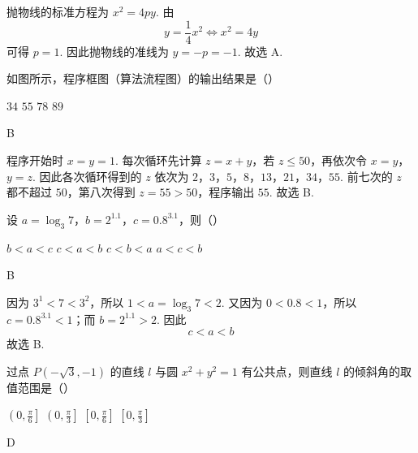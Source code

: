 \begin{solution}
抛物线的标准方程为 \(x^2=4py\). 由
\[
y=\frac14x^2\Longleftrightarrow x^2=4y
\]
可得 \(p=1\). 因此抛物线的准线为 \(y=-p=-1\).
故选 A.
\end{solution}

\begin{problem}
如图所示，程序框图（算法流程图）的输出结果是（\quad）


\choices
    {\(34\)}
    {\(55\)}
    {\(78\)}
    {\(89\)}

\begin{answer}
B
\end{answer}
\end{problem}

\begin{solution}
程序开始时 \(x=y=1\). 每次循环先计算 \(z=x+y\)，若 \(z\leqslant50\)，再依次令 \(x=y\)，\(y=z\). 因此各次循环得到的 \(z\) 依次为
\(2\)，\(3\)，\(5\)，\(8\)，\(13\)，\(21\)，\(34\)，\(55\).
前七次的 \(z\) 都不超过 \(50\)，第八次得到 \(z=55>50\)，程序输出 \(55\).
故选 B.
\end{solution}

\begin{problem}
设 \(a = \log_{3} 7\)，\(b = 2^{1.1}\)，\(c = 0.8^{3.1}\)，则（\quad）

\choices
    {\(b < a < c\)}
    {\(c < a < b\)}
    {\(c < b < a\)}
    {\(a < c < b\)}

\begin{answer}
B
\end{answer}
\end{problem}

\begin{solution}
因为 \(3^1<7<3^2\)，所以 \(1<a=\log_3 7<2\). 又因为 \(0<0.8<1\)，所以 \(c=0.8^{3.1}<1\)；而 \(b=2^{1.1}>2\).
因此
\[
c<a<b
\]
故选 B.
\end{solution}

\begin{problem}
过点 \(P(-\sqrt{3}, -1)\) 的直线 \(l\) 与圆 \(x^{2} + y^{2} = 1\) 有公共点，则直线 \(l\) 的倾斜角的取值范围是（\quad）

\choices
    {\(\left(0, \frac{\pi}{6}\right]\)}
    {\(\left(0, \frac{\pi}{3}\right]\)}
    {\(\left[0, \frac{\pi}{6}\right]\)}
    {\(\left[0, \frac{\pi}{3}\right]\)}

\begin{answer}
D
\end{answer}
\end{problem}

